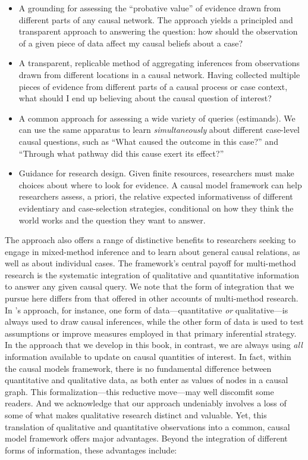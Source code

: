 \documentclass[
  12pt,
]{book}
\providecommand{\tightlist}{%
  \setlength{\itemsep}{0pt}\setlength{\parskip}{0pt}}
\begin{document}
\begin{itemize}
\item
  A grounding for assessing the ``probative value'' of evidence drawn from different parts of any causal network. The approach yields a principled and transparent approach to answering the question: how should the observation of a given piece of data affect my causal beliefs about a case?
\item
  A transparent, replicable method of aggregating inferences from observations drawn from different locations in a causal network. Having collected multiple pieces of evidence from different parts of a causal process or case context, what should I end up believing about the causal question of interest?
\item
  A common approach for assessing a wide variety of queries (estimands). We can use the same apparatus to learn \emph{simultaneously} about different case-level causal questions, such as ``What caused the outcome in this case?'' and ``Through what pathway did this cause exert its effect?''
\end{itemize}

\begin{itemize}
\tightlist
\item
  Guidance for research design. Given finite resources, researchers must make choices about where to look for evidence. A causal model framework can help researchers assess, a priori, the relative expected informativenss of different evidentiary and case-selection strategies, conditional on how they think the world works and the question they want to answer.
\end{itemize}

The approach also offers a range of distinctive benefits to researchers seeking to engage in mixed-method inference and to learn about general causal relations, as well as about individual cases. The framework's central payoff for multi-method research is the systematic integration of qualitative and quantitative information to answer any given causal query. We note that the form of integration that we pursue here differs from that offered in other accounts of multi-method research. In \citet{seawrightbook}'s approach, for instance, one form of data---quantitative \emph{or} qualitative---is always used to draw causal inferences, while the other form of data is used to test assumptions or improve measures employed in that primary inferential strategy. In the approach that we develop in this book, in contrast, we are always using \emph{all} information available to update on causal quantities of interest. In fact, within the causal models framework, there is no fundamental difference between quantitative and qualitative data, as both enter as values of nodes in a causal graph. This formalization---this reductive move---may well discomfit some readers. And we acknowledge that our approach undeniably involves a loss of some of what makes qualitative research distinct and valuable. Yet, this translation of qualitative and quantitative observations into a common, causal model framework offers major advantages. Beyond the integration of different forms of information, these advantages include:
\end{document}

